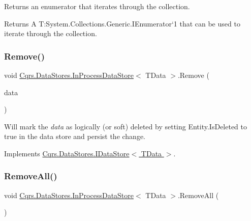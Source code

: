 Returns an enumerator that iterates through the collection. 

\begin{DoxyReturn}{Returns}
A T\+:\+System.\+Collections.\+Generic.\+I\+Enumerator`1 that can be used to iterate through the collection. 
\end{DoxyReturn}
\mbox{\label{classCqrs_1_1DataStores_1_1InProcessDataStore_a43a93c614a403181e0641106ca9509d6_a43a93c614a403181e0641106ca9509d6}} 
\subsubsection{\texorpdfstring{Remove()}{Remove()}}
{\footnotesize\ttfamily void \hyperlink{classCqrs_1_1DataStores_1_1InProcessDataStore}{Cqrs.\+Data\+Stores.\+In\+Process\+Data\+Store}$<$ T\+Data $>$.Remove (\begin{DoxyParamCaption}\item[{T\+Data}]{data }\end{DoxyParamCaption})}



Will mark the {\itshape data}  as logically (or soft) deleted by setting Entity.\+Is\+Deleted to true in the data store and persist the change. 



Implements \hyperlink{interfaceCqrs_1_1DataStores_1_1IDataStore_a7ef540796bbe4257296841590bc23478_a7ef540796bbe4257296841590bc23478}{Cqrs.\+Data\+Stores.\+I\+Data\+Store$<$ T\+Data $>$}.

\mbox{\label{classCqrs_1_1DataStores_1_1InProcessDataStore_acd350f7abef7311064434ae31a50755b_acd350f7abef7311064434ae31a50755b}} 
\subsubsection{\texorpdfstring{Remove\+All()}{RemoveAll()}}
{\footnotesize\ttfamily void \hyperlink{classCqrs_1_1DataStores_1_1InProcessDataStore}{Cqrs.\+Data\+Stores.\+In\+Process\+Data\+Store}$<$ T\+Data $>$.Remove\+All (\begin{DoxyParamCaption}{ }\end{DoxyParamCaption})}



